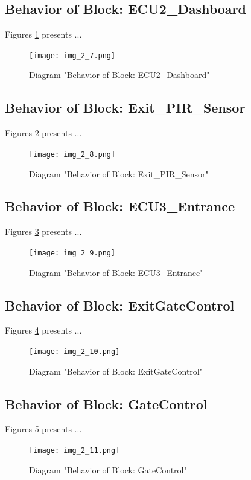 \subsection{Behavior of Block: ECU2\_Dashboard}
Figures \ref{fig:ECU2DashboardECU2Dashboard27} presents ...
\begin{figure}[htb]
\centering
\texttt{[image: img\_2\_7.png]}
\caption{Diagram "Behavior of Block: ECU2\_Dashboard"}
\label{fig:ECU2DashboardECU2Dashboard27}
\end{figure}

\subsection{Behavior of Block: Exit\_PIR\_Sensor}
Figures \ref{fig:ExitPIRSensorExitPIRSensor28} presents ...
\begin{figure}[htb]
\centering
\texttt{[image: img\_2\_8.png]}
\caption{Diagram "Behavior of Block: Exit\_PIR\_Sensor"}
\label{fig:ExitPIRSensorExitPIRSensor28}
\end{figure}

\subsection{Behavior of Block: ECU3\_Entrance}
Figures \ref{fig:ECU3EntranceECU3Entrance29} presents ...
\begin{figure}[htb]
\centering
\texttt{[image: img\_2\_9.png]}
\caption{Diagram "Behavior of Block: ECU3\_Entrance"}
\label{fig:ECU3EntranceECU3Entrance29}
\end{figure}

\subsection{Behavior of Block: ExitGateControl}
Figures \ref{fig:ExitGateControlExitGateControl210} presents ...
\begin{figure}[htb]
\centering
\texttt{[image: img\_2\_10.png]}
\caption{Diagram "Behavior of Block: ExitGateControl"}
\label{fig:ExitGateControlExitGateControl210}
\end{figure}

\subsection{Behavior of Block: GateControl}
Figures \ref{fig:GateControlGateControl211} presents ...
\begin{figure}[htb]
\centering
\texttt{[image: img\_2\_11.png]}
\caption{Diagram "Behavior of Block: GateControl"}
\label{fig:GateControlGateControl211}
\end{figure}


